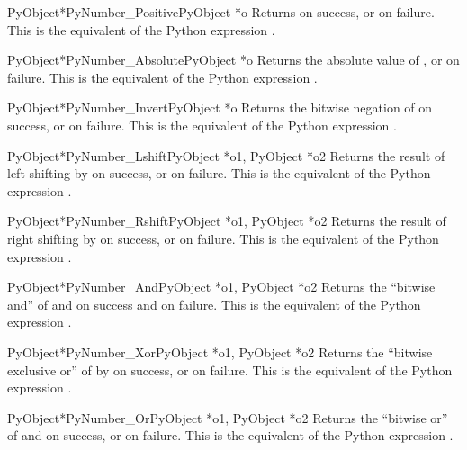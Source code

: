 \begin{cfuncdesc}{PyObject*}{PyNumber_Positive}{PyObject *o}
  Returns  on success, or \NULL{} on failure.  This is the
  equivalent of the Python expression .
\end{cfuncdesc}


\begin{cfuncdesc}{PyObject*}{PyNumber_Absolute}{PyObject *o}
  Returns the absolute value of , or \NULL{} on failure.  This
  is the equivalent of the Python expression .
\end{cfuncdesc}


\begin{cfuncdesc}{PyObject*}{PyNumber_Invert}{PyObject *o}
  Returns the bitwise negation of  on success, or \NULL{} on
  failure.  This is the equivalent of the Python expression
  .
\end{cfuncdesc}


\begin{cfuncdesc}{PyObject*}{PyNumber_Lshift}{PyObject *o1, PyObject *o2}
  Returns the result of left shifting  by  on success,
  or \NULL{} on failure.  This is the equivalent of the Python
  expression .
\end{cfuncdesc}


\begin{cfuncdesc}{PyObject*}{PyNumber_Rshift}{PyObject *o1, PyObject *o2}
  Returns the result of right shifting  by  on
  success, or \NULL{} on failure.  This is the equivalent of the
  Python expression .
\end{cfuncdesc}


\begin{cfuncdesc}{PyObject*}{PyNumber_And}{PyObject *o1, PyObject *o2}
  Returns the ``bitwise and'' of  and  on success and
  \NULL{} on failure. This is the equivalent of the Python expression
  .
\end{cfuncdesc}


\begin{cfuncdesc}{PyObject*}{PyNumber_Xor}{PyObject *o1, PyObject *o2}
  Returns the ``bitwise exclusive or'' of  by  on
  success, or \NULL{} on failure.  This is the equivalent of the
  Python expression .
\end{cfuncdesc}

\begin{cfuncdesc}{PyObject*}{PyNumber_Or}{PyObject *o1, PyObject *o2}
  Returns the ``bitwise or'' of  and  on success, or
  \NULL{} on failure.  This is the equivalent of the Python expression
  .
\end{cfuncdesc}


